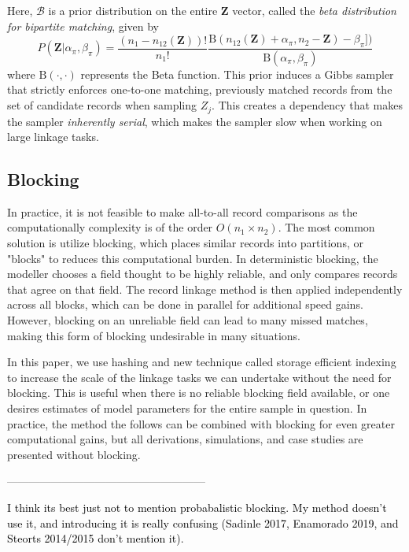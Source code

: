 \documentclass[12pt,letterpaper]{article}
\newcommand{\1}[1]{\mathbb{I}\!\left[#1\right]} %
\begin{document}
{Here, $\mathcal{B}$ is a prior distribution on the entire \(\mathbf{Z}\) vector, called the \emph{beta distribution for bipartite matching}, given by
$$P(\mathbf{Z}|\alpha_{\pi}, \beta_{\pi}) = \frac{(n_1 - n_{12}(\mathbf{Z}))!}{n_1 !}\frac{\text{B}(n_{12}(\mathbf{Z}) + \alpha_{\pi}, n_2 - \mathbf{Z}) - \beta_{\pi}])}{\text{B}(\alpha_{\pi}, \beta_{\pi})}
$$
where $\text{B}(\cdot, \cdot)$ represents the Beta function. This prior induces a Gibbs sampler that strictly enforces one-to-one matching,  previously matched records from the set of candidate
records when sampling \(Z_j\). This creates a dependency that makes the
sampler \emph{inherently serial}, which makes the sampler slow when working on large linkage tasks. 

\subsection{Blocking}

In practice, it is not feasible to make all-to-all record comparisons as the computationally complexity is of the order $O(n_1 \times n_2).$ The most common solution is utilize blocking, which places similar records into partitions, or "blocks" to reduces this computational burden. In deterministic blocking, the modeller chooses a field thought to be highly reliable, and only compares records that agree on that field. The record linkage method is then applied independently across all blocks, which can be done in parallel for additional speed gains. However, blocking on an unreliable field can lead to many missed matches, making this form of blocking undesirable in many situations.

In this paper, we use hashing and new technique called storage efficient indexing to increase the scale of the linkage tasks we can undertake without the need for blocking. This is useful when there is no reliable blocking field available, or one desires estimates of model parameters for the entire sample in question. In practice, the method the follows can be combined with blocking for even greater computational gains, but all derivations, simulations, and case studies are presented without blocking. 

------------------------------------------------------

\textcolor{black}{I think its best just not to mention probabalistic blocking. My method doesn't use it, and introducing it is really confusing (Sadinle 2017, Enamorado 2019, and Steorts 2014/2015 don't mention it).}

}
\end{document}
